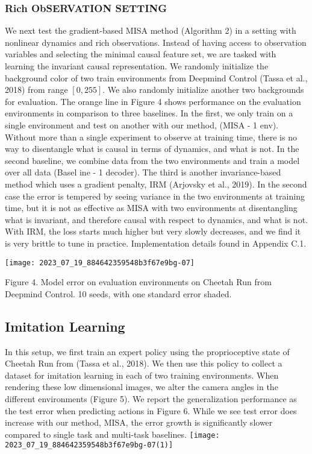 \documentclass[10pt]{article}
\begin{document}
\subsubsection{Rich ObSERVATION SETTING}
We next test the gradient-based MISA method (Algorithm 2) in a setting with nonlinear dynamics and rich observations. Instead of having access to observation variables and selecting the minimal causal feature set, we are tasked with learning the invariant causal representation. We randomly initialize the background color of two train environments from Deepmind Control (Tassa et al., 2018) from range $[0,255]$. We also randomly initialize another two backgrounds for evaluation. The orange line in Figure 4 shows performance on the evaluation environments in comparison to three baselines. In the first, we only train on a single environment and test on another with our method, (MISA - 1 env). Without more than a single experiment to observe at training time, there is no way to disentangle what is causal in terms of dynamics, and what is not. In the second baseline, we combine data from the two environments and train a model over all data (Basel ine - 1 decoder). The third is another invariance-based method which uses a gradient penalty, IRM (Arjovsky et al., 2019). In the second case the error is tempered by seeing variance in the two environments at training time, but it is not as effective as MISA with two environments at disentangling what is invariant, and therefore causal with respect to dynamics, and what is not. With IRM, the loss starts much higher but very slowly decreases, and we find it is very brittle to tune in practice. Implementation details found in Appendix C.1.

\begin{center}
\texttt{[image: 2023\_07\_19\_884642359548b3f67e9bg-07]}
\end{center}

Figure 4. Model error on evaluation environments on Cheetah Run from Deepmind Control. 10 seeds, with one standard error shaded.

\subsection{Imitation Learning}
In this setup, we first train an expert policy using the proprioceptive state of Cheetah Run from (Tassa et al., 2018). We then use this policy to collect a dataset for imitation learning in each of two training environments. When rendering these low dimensional images, we alter the camera angles in the different environments (Figure 5). We report the generalization performance as the test error when predicting actions in Figure 6. While we see test error does increase with our method, MISA, the error growth is significantly slower compared to single task and multi-task baselines.
\texttt{[image: 2023\_07\_19\_884642359548b3f67e9bg-07(1)]}
\end{document}

